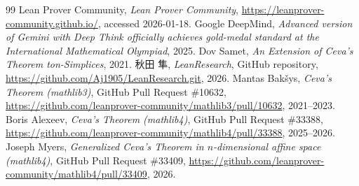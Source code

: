 \documentclass[a4paper,12pt]{bxjsbook}
\theoremstyle{theorem}
\begin{document}
    \begin{thebibliography}{99}
         Lean Prover Community, \emph{Lean Prover Community}, \url{https://leanprover-community.github.io/}, accessed 2026-01-18.
         Google DeepMind, \emph{Advanced version of Gemini with Deep Think officially achieves gold-medal standard at the International Mathematical Olympiad}, 2025.
         Dov Samet, \emph{An Extension of Ceva's Theorem ton-Simplices}, 2021.
         秋田 隼, \emph{LeanResearch}, GitHub repository, \url{https://github.com/Aj1905/LeanResearch.git}, 2026.
         Mantas Bakšys, \emph{Ceva's Theorem (mathlib3)}, GitHub Pull Request \#10632, \url{https://github.com/leanprover-community/mathlib3/pull/10632}, 2021--2023.
         Boris Alexeev, \emph{Ceva's Theorem (mathlib4)}, GitHub Pull Request \#33388, \url{https://github.com/leanprover-community/mathlib4/pull/33388}, 2025--2026.
         Joseph Myers, \emph{Generalized Ceva's Theorem in $n$-dimensional affine space (mathlib4)}, GitHub Pull Request \#33409, \url{https://github.com/leanprover-community/mathlib4/pull/33409}, 2026.
    \end{thebibliography}
\end{document}
